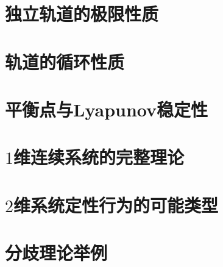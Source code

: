\section{独立轨道的极限性质}
\section{轨道的循环性质}
\section{平衡点与Lyapunov稳定性}
\section{$1$维连续系统的完整理论}
\section{$2$维系统定性行为的可能类型}\label{sec:1.8}
\section{分歧理论举例}
